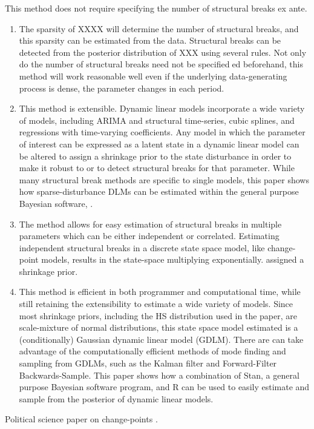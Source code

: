 This method does not require specifying the number of structural breaks ex ante.
\begin{enumerate}
\item The sparsity of XXXX will determine the number of structural breaks, and this sparsity can be estimated from the data.
Structural breaks can be detected from the posterior distribution of XXX using several rules. Not only do
the number of structural breaks need not be specifieded beforehand, this method will work reasonable
well even if the underlying data-generating process is dense, \ie{}the parameter changes in each period.
\item This method is extensible. 
  Dynamic linear models incorporate a wide variety of models, including ARIMA
  and structural time-series, cubic splines, and regressions with time-varying coefficients. Any model in
  which the parameter of interest can be expressed as a latent state in a dynamic linear model can be
  altered to assign a shrinkage prior to the state disturbance in order to make it robust to or to detect
  structural breaks for that parameter. While many structural break methods are specific to single
  models, this paper shows how sparse-disturbance DLMs can be estimated within the general purpose
  Bayesian software, \Stan{}.
\item The method allows for easy estimation of structural breaks in multiple parameters which can be either
independent or correlated. Estimating independent structural breaks in a discrete state space model,
like change-point models, results in the state-space multiplying exponentially.
assigned a shrinkage prior.
\item This method is efficient in both programmer and computational time, while still retaining the extensibility
to estimate a wide variety of models. Since most shrinkage priors, including the HS distribution
used in the paper, are scale-mixture of normal distributions, this state space model estimated is a
(conditionally) Gaussian dynamic linear model (GDLM). There are can take advantage of the computationally
efficient methods of mode finding and sampling from GDLMs, such as the Kalman filter and
Forward-Filter Backwards-Sample. This paper shows how a combination of Stan, a general purpose
Bayesian software program, and R can be used to easily estimate and sample from the posterior of
dynamic linear models.
\end{enumerate}

Political science paper on change-points \parencites{CalderiaZorn1998}{WesternKleykamp2004}{Spirling2007a}{Spirling2007b}{Park2010}{Park2011}{Blackwell2012}.



